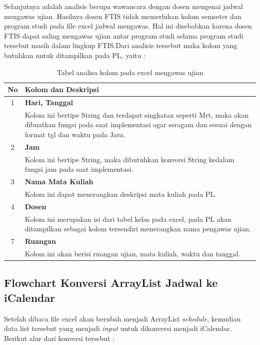 Selanjutnya adalah analisis berupa wawancara dengan dosen mengenai jadwal mengawas ujian. Hasilnya dosen FTIS tidak memerlukan kolom semseter dan program studi pada file excel jadwal mengawas. Hal ini disebabkan karena dosen FTIS dapat saling mengawas ujian antar program studi selama program studi tersebut masih dalam lingkup FTIS.Dari analisis tersebut maka kolom yang butuhkan untuk ditampilkan pada PL, yaitu :
\begin{table}[H]
		\centering
		\caption{Tabel analisa kolom pada excel mengawas ujian}
		\label{tab:analisa_kolom}
\begin{tabular}{|c|p{12cm}|}
		\hline
		\textbf{No} & \textbf{Kolom dan Deskripsi} \\ \hline \hline
		1 & \textbf{Hari, Tanggal}\\
			&	Kolom ini bertipe String dan terdapat singkatan seperti Mrt, maka akan dibuatkan fungsi pada saat implementasi agar seragam dan sesuai dengan format tgl dan waktu pada Java.\\ \hline	
		2 & \textbf{Jam}\\
			&	Kolom ini bertipe String, maka dibutuhkan konversi String kedalam fungsi jam pada saat implementasi.\\ \hline
		3 & \textbf{Nama Mata Kuliah}\\
			&	Kolom ini dapat menerangkan deskripsi mata kuliah pada PL.\\ \hline
		4 & \textbf{Dosen}\\
			&	Kolom ini merupakan isi dari tabel kelas pada excel, pada PL akan ditampilkan sebagai kolom tersendiri menerangkan nama pengawas ujian.\\ \hline		
		7 & \textbf{Ruangan}\\
			&	Kolom ini akan berisi ruangan ujian, mata kuliah, waktu dan tanggal.\\ \hline
	\end{tabular}
\end{table}

\subsection{Flowchart Konversi ArrayList Jadwal ke iCalendar}
Setelah dibaca file excel akan berubah menjadi ArrayList \textit{schedule}, kemudian data list tersebut yang menjadi \textit{input} untuk dikonversi menjadi iCalendar. Berikut alur dari konversi tersebut :

